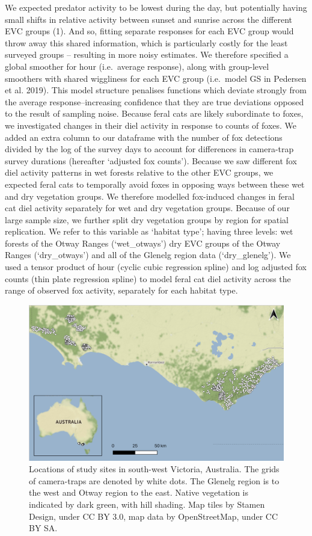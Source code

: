 \documentclass[]{elsarticle} %
\begin{document}
We expected predator activity to be lowest during the day, but potentially having small shifts in relative activity between sunset and sunrise across the different EVC groups (1). And so, fitting separate responses for each EVC group would throw away this shared information, which is particularly costly for the least surveyed groups -- resulting in more noisy estimates. We therefore specified a global smoother for hour (i.e.~average response), along with group-level smoothers with shared wiggliness for each EVC group (i.e.~model GS in Pedersen et al. 2019). This model structure penalises functions which deviate strongly from the average response--increasing confidence that they are true deviations opposed to the result of sampling noise.
Because feral cats are likely subordinate to foxes, we investigated changes in their diel activity in response to counts of foxes. We added an extra column to our dataframe with the number of fox detections divided by the log of the survey days to account for differences in camera-trap survey durations (hereafter `adjusted fox counts'). Because we saw different fox diel activity patterns in wet forests relative to the other EVC groups, we expected feral cats to temporally avoid foxes in opposing ways between these wet and dry vegetation groups. We therefore modelled fox-induced changes in feral cat diel activity separately for wet and dry vegetation groups. Because of our large sample size, we further split dry vegetation groups by region for spatial replication. We refer to this variable as `habitat type'; having three levels: wet forests of the Otway Ranges (`wet\_otways') dry EVC groups of the Otway Ranges (`dry\_otways') and all of the Glenelg region data (`dry\_glenelg'). We used a tensor product of hour (cyclic cubic regression spline) and log adjusted fox counts (thin plate regression spline) to model feral cat diel activity across the range of observed fox activity, separately for each habitat type.

\newpage

\begin{figure}
\includegraphics[width=1\linewidth]{../figs/fig1_map} \caption{Locations of study sites in south-west Victoria, Australia. The grids of camera-traps are denoted by white dots. The Glenelg region is to the west and Otway region to the east. Native vegetation is indicated by dark green, with hill shading. Map tiles by Stamen Design, under CC BY 3.0, map data by OpenStreetMap, under CC BY SA.}\label{fig:map}
\end{figure}
\end{document}
